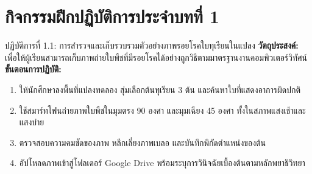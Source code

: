 \section*{กิจกรรมฝึกปฏิบัติการประจำบทที่ 1}
\begin{nocodebox}{ปฏิบัติการที่ 1.1: การสำรวจและเก็บรวบรวมตัวอย่างภาพรอยโรคใบทุเรียนในแปลง}
\textbf{วัตถุประสงค์:} เพื่อให้ผู้เรียนสามารถเก็บภาพถ่ายใบพืชที่มีรอยโรคได้อย่างถูกวิธีตามมาตรฐานงานคอมพิวเตอร์วิทัศน์\\
\textbf{ขั้นตอนการปฏิบัติ:}
\begin{enumerate}[leftmargin=1.4em, itemsep=2pt]
    \item ให้นักศึกษาลงพื้นที่แปลงทดลอง สุ่มเลือกต้นทุเรียน 3 ต้น และค้นหาใบที่แสดงอาการผิดปกติ
    \item ใช้สมาร์ทโฟนถ่ายภาพใบพืชในมุมตรง 90 องศา และมุมเฉียง 45 องศา ทั้งในสภาพแสงเช้าและแสงบ่าย
    \item ตรวจสอบความคมชัดของภาพ หลีกเลี่ยงภาพเบลอ และบันทึกพิกัดตำแหน่งของต้น
    \item อัปโหลดภาพเข้าสู่โฟลเดอร์ Google Drive พร้อมระบุการวินิจฉัยเบื้องต้นตามหลักพยาธิวิทยา
\end{enumerate}
\end{nocodebox}
